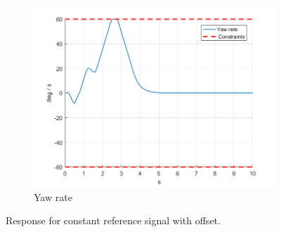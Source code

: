 \documentclass[11pt]{article}
\begin{document}
\begin{enumerate}
\begin{figure}[ht]
\begin{subfigure}[c]{0.3\linewidth}
            \includegraphics[width=\linewidth]{Plots_05_ReferenceTracking_Constant/06}
            \caption{Yaw rate}
        \end{subfigure}
        \caption{Response for constant reference signal with offset.}
        \label{fig:constant_reference_with_offset}
\end{figure}


\end{enumerate}
\end{document}
